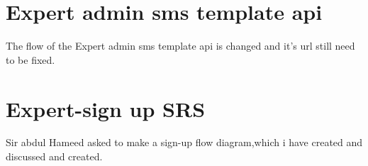 \documentclass[12pt,a4paper]{article}
\begin{document}
	
 
 \clearpage
\section{Expert admin sms template api}
The flow of the Expert admin sms template api is changed and it's url still need to be fixed.
\section{Expert-sign up SRS}
Sir abdul Hameed asked to make a sign-up flow diagram,which i have created and discussed and created.
\end{document}
